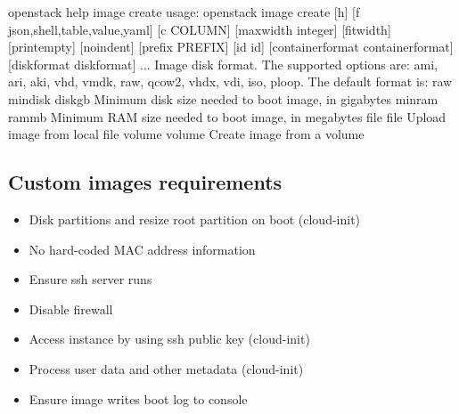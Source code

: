 \documentclass[letterpaper,10pt,english]{sphinxmanual}
\begin{document}
\begin{sphinxVerbatim}[commandchars=\\\{\}]
\PYGZdl{} openstack help image create
usage: openstack image create [\PYGZhy{}h] [\PYGZhy{}f \PYGZob{}json,shell,table,value,yaml\PYGZcb{}]
                              [\PYGZhy{}c COLUMN] [\PYGZhy{}\PYGZhy{}max\PYGZhy{}width \PYGZlt{}integer\PYGZgt{}]
                              [\PYGZhy{}\PYGZhy{}fit\PYGZhy{}width] [\PYGZhy{}\PYGZhy{}print\PYGZhy{}empty] [\PYGZhy{}\PYGZhy{}noindent]
                              [\PYGZhy{}\PYGZhy{}prefix PREFIX] [\PYGZhy{}\PYGZhy{}id \PYGZlt{}id\PYGZgt{}]
                              [\PYGZhy{}\PYGZhy{}container\PYGZhy{}format \PYGZlt{}container\PYGZhy{}format\PYGZgt{}]
                              [\PYGZhy{}\PYGZhy{}disk\PYGZhy{}format \PYGZlt{}disk\PYGZhy{}format\PYGZgt{}]
...
                        Image disk format. The supported options are: ami,
                        ari, aki, vhd, vmdk, raw, qcow2, vhdx, vdi, iso,
                        ploop. The default format is: raw
  \PYGZhy{}\PYGZhy{}min\PYGZhy{}disk \PYGZlt{}disk\PYGZhy{}gb\PYGZgt{}  Minimum disk size needed to boot image, in gigabytes
  \PYGZhy{}\PYGZhy{}min\PYGZhy{}ram \PYGZlt{}ram\PYGZhy{}mb\PYGZgt{}    Minimum RAM size needed to boot image, in megabytes
  \PYGZhy{}\PYGZhy{}file \PYGZlt{}file\PYGZgt{}         Upload image from local file
  \PYGZhy{}\PYGZhy{}volume \PYGZlt{}volume\PYGZgt{}     Create image from a volume
\end{sphinxVerbatim}


\subsection{Custom images requirements}
\label{\detokenize{basics/README:custom-images-requirements}}\begin{itemize}
\item {} 
Disk partitions and resize root partition on boot (cloud-init)

\item {} 
No hard-coded MAC address information

\item {} 
Ensure ssh server runs

\item {} 
Disable firewall

\item {} 
Access instance by using ssh public key (cloud-init)

\item {} 
Process user data and other metadata (cloud-init)

\item {} 
Ensure image writes boot log to console

\end{itemize}
\end{document}
